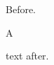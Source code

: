 \documentclass{article}
\begin{document}
Before.

\begin{minipage}{3cm}A\end{minipage} text after.
\end{document}
